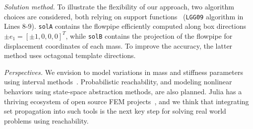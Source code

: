 \documentclass{juliacon}
\begin{document}
\noindent \emph{Solution method.} To illustrate the flexibility of our approach, two algorithm choices are considered, both relying on support functions~\cite{LeGuernic2010250} (\texttt{LGG09} algorithm in Lines 8-9).
%
\texttt{solA} contains the flowpipe efficiently computed along box directions $\pm e_1 = [\pm 1, 0, 0, 0]^T$, while \texttt{solB} contains the projection of the flowpipe for displacement coordinates of each mass. To improve the accuracy, the latter method uses octagonal template directions.

\vspace{0.2cm}

\noindent \emph{Perspectives.} We envision to model variations in mass and stiffness parameters using interval methods~\cite{forets2021intervalmat, ferranti2021interval}.
%
Probabilistic reachability, and modeling nonlinear behaviors using state-space abstraction methods, are also planned.
%
Julia has a thriving ecosystem of open source FEM projects~\cite{Gridap,Ferrite,FinEtools}, and we think that integrating set propagation into such tools is the next key step for solving real world problems using reachability.


	
\end{document}
